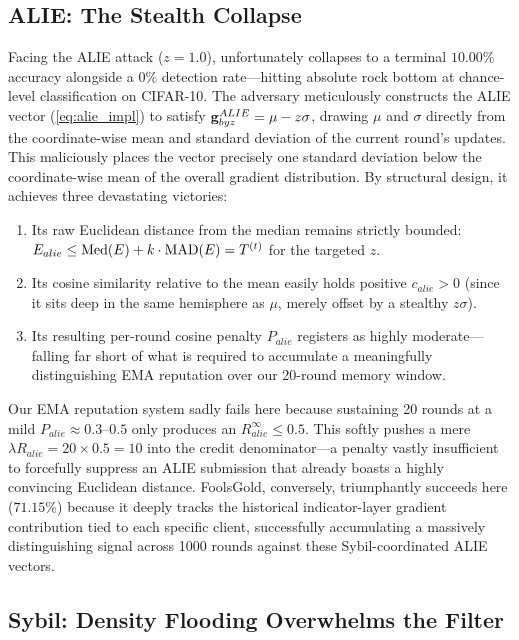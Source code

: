 \documentclass[../main.tex]{subfiles}
\begin{document}
\subsection{ALIE: The Stealth Collapse}
\label{sec:results_alie}

Facing the ALIE attack ($z=1.0$), \aegis{} unfortunately collapses to a terminal $10.00\%$ accuracy alongside a $0\%$ detection rate---hitting absolute rock bottom at chance-level classification on CIFAR-10. The adversary meticulously constructs the ALIE vector (\cref{eq:alie_impl}) to satisfy $\mathbf{g}_{byz}^{ALIE} = \mu - z\sigma$, drawing $\mu$ and $\sigma$ directly from the coordinate-wise mean and standard deviation of the current round's updates. This maliciously places the vector precisely one standard deviation below the coordinate-wise mean of the overall gradient distribution. By structural design, it achieves three devastating victories:
\begin{enumerate}
    \item Its raw Euclidean distance from the median remains strictly bounded: $E_{alie} \leq \operatorname{Med}(E) + k \cdot \text{MAD}(E) = T^{(t)}$ for the targeted $z$.
    \item Its cosine similarity relative to the mean easily holds positive $c_{alie} > 0$ (since it sits deep in the same hemisphere as $\mu$, merely offset by a stealthy $z\sigma$).
    \item Its resulting per-round cosine penalty $P_{alie}$ registers as highly moderate---falling far short of what is required to accumulate a meaningfully distinguishing EMA reputation over our 20-round memory window.
\end{enumerate}

Our EMA reputation system sadly fails here because sustaining 20 rounds at a mild $P_{alie} \approx 0.3$--$0.5$ only produces an $R_{alie}^\infty \leq 0.5$. This softly pushes a mere $\lambda R_{alie} = 20 \times 0.5 = 10$ into the credit denominator---a penalty vastly insufficient to forcefully suppress an ALIE submission that already boasts a highly convincing Euclidean distance. FoolsGold, conversely, triumphantly succeeds here ($71.15\%$) because it deeply tracks the historical indicator-layer gradient contribution tied to each specific client, successfully accumulating a massively distinguishing signal across 1000 rounds against these Sybil-coordinated ALIE vectors.

\subsection{Sybil: Density Flooding Overwhelms the Filter}
\label{sec:results_sybil}
\end{document}
